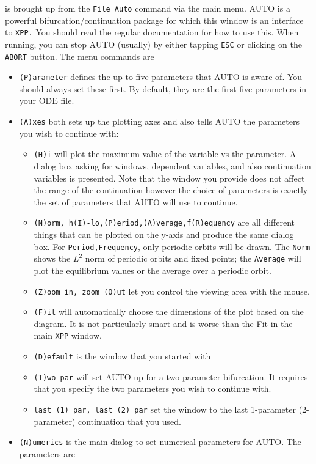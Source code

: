 \documentclass{article}
\begin{document}
\bigskip
{} is brought up from the {\tt File Auto} command via the main menu. AUTO is a powerful bifurcation/continuation package for which this window is an interface to {\tt XPP.} You should read the regular documentation for how to use this. When running, you can stop AUTO (usually) by either tapping {\tt ESC} or clicking on the {\tt ABORT} button.
The menu commands are
\begin{itemize}
\item {\tt (P)arameter} defines the up to five parameters that AUTO is aware of. You should always set these first. By default, they are the first five parameters in your ODE file.  
\item {\tt (A)xes} both sets up the plotting axes and also tells AUTO the parameters you wish to continue with:
\begin{itemize}
\item {\tt (H)i} will plot the maximum value of the variable vs the parameter. A dialog box asking for windows, dependent variables, and also continuation variables is presented. Note that the window you provide does not affect the range of the continuation however the choice of parameters is exactly the set of parameters that AUTO will use to continue. 
\item {\tt (N)orm, h(I)-lo,(P)eriod,(A)verage,f(R)equency} are all different things that can be plotted on the y-axis and produce the same dialog box. For {\tt Period,Frequency}, only periodic orbits will be drawn. The {\tt Norm} shows the $L^2$ norm of periodic orbits and fixed points; the {\tt Average} will plot the equilibrium values or the average over a periodic orbit.  
\item {\tt (Z)oom in, zoom (O)ut} let you control the viewing area with the mouse. 
\item {\tt (F)it} will automatically choose the dimensions of the plot based on the diagram. It is not particularly smart and is worse than the Fit in the main {\tt XPP} window. 
\item {\tt (D)efault} is the window that you started with
\item {\tt (T)wo par} will set AUTO up for a two parameter bifurcation. It requires that you specify the two parameters you wish to continue with. 
\item {\tt last (1) par, last (2) par} set the window to the last 1-parameter (2-parameter) continuation that you used.
\end{itemize}   
\item {\tt (N)umerics} is the main dialog to set numerical parameters for AUTO. The parameters are 

\end{itemize}
\end{document}
